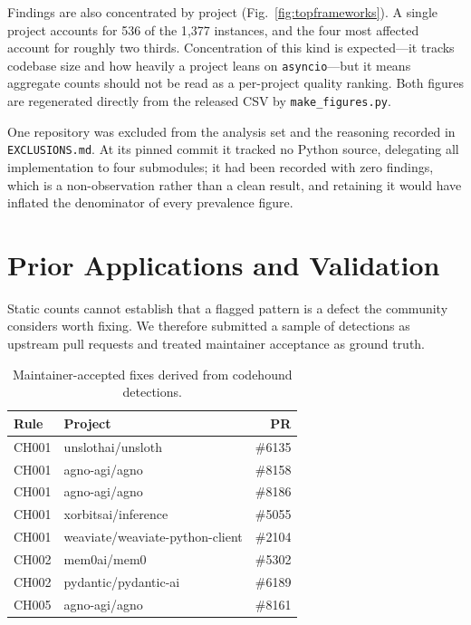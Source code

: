 \documentclass[conference]{IEEEtran}
\begin{document}
Findings are also concentrated by project (Fig.~\ref{fig:topframeworks}). A single project accounts for 536 of the 1{,}377 instances, and the four most affected account for roughly two thirds. Concentration of this kind is expected---it tracks codebase size and how heavily a project leans on \texttt{asyncio}---but it means aggregate counts should not be read as a per-project quality ranking. Both figures are regenerated directly from the released CSV by \texttt{make\_figures.py}.

One repository was excluded from the analysis set and the reasoning recorded in \texttt{EXCLUSIONS.md}. At its pinned commit it tracked no Python source, delegating all implementation to four submodules; it had been recorded with zero findings, which is a non-observation rather than a clean result, and retaining it would have inflated the denominator of every prevalence figure.

\section{Prior Applications and Validation}
\label{sec:validation}
Static counts cannot establish that a flagged pattern is a defect the community considers worth fixing. We therefore submitted a sample of detections as upstream pull requests and treated maintainer acceptance as ground truth.

\begin{table}[t]
\caption{Maintainer-accepted fixes derived from codehound detections.}
\label{tab:merged}
\centering
\begin{tabular}{llr}
\toprule
\textbf{Rule} & \textbf{Project} & \textbf{PR} \\
\midrule
CH001 & unslothai/unsloth              & \#6135 \\
CH001 & agno-agi/agno                  & \#8158 \\
CH001 & agno-agi/agno                  & \#8186 \\
CH001 & xorbitsai/inference            & \#5055 \\
CH001 & weaviate/weaviate-python-client& \#2104 \\
CH002 & mem0ai/mem0                    & \#5302 \\
CH002 & pydantic/pydantic-ai           & \#6189 \\
CH005 & agno-agi/agno                  & \#8161 \\
\bottomrule
\end{tabular}
\end{table}
\end{document}
